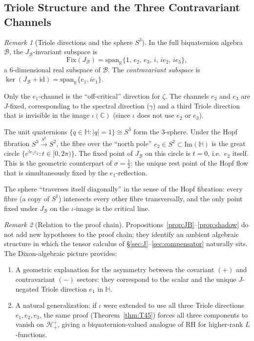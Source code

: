 \documentclass[12pt,a4paper]{article}
\theoremstyle{remark}
\newtheorem*{remark}{Remark}
\begin{document}
\subsection*{Triole Structure and the Three Contravariant Channels}

\begin{remark}[Triole directions and the sphere $S^3$]\label{rem:triole}
In the full biquaternion algebra $\mathcal{B}$, the $J_{\mathcal{B}}$-invariant
subspace is
\[
  \mathrm{Fix}(J_{\mathcal{B}})
  = \mathrm{span}_{\mathbb{R}}\{1,\,e_2,\,e_3,\,i,\,ie_2,\,ie_3\},
\]
a $6$-dimensional real subspace of $\mathcal{B}$.
The \emph{contravariant subspace} is $\ker(J_{\mathcal{B}}+\mathrm{id})
= \mathrm{span}_{\mathbb{R}}\{e_1, ie_1\}$.

Only the $e_1$-channel is the ``off-critical'' direction for $\zeta$.
The channels $e_2$ and $e_3$ are $J$-fixed, corresponding to the spectral
direction ($\gamma$) and a third Triole direction that is invisible in the
image $\iota(\mathbb{C})$ (since $\iota$ does not use $e_2$ or $e_3$).

The unit quaternions $\{q\in\mathbb{H}:|q|=1\}\cong S^3$ form the
3-sphere. Under the Hopf fibration
$S^3\xrightarrow{S^1} S^2$, the fibre over the ``north pole''
$e_2\in S^2\subset\mathrm{Im}(\mathbb{H})$ is the great circle
$\{e^{te_1e_2}:t\in[0,2\pi)\}$.
The fixed point of $J_{\mathcal{B}}$ on this circle is $t=0$,
i.e.\ $e_2$ itself.
This is the geometric counterpart of $\sigma=\tfrac{1}{2}$:
the unique rest point of the Hopf flow that is simultaneously fixed by
the $e_1$-reflection.

The sphere ``traverses itself diagonally'' in the sense of the Hopf
fibration: every fibre (a copy of $S^1$) intersects every other fibre
transversally, and the only point fixed under $J_{\mathcal{B}}$ on the
$\iota$-image is the critical line.
\end{remark}

\begin{remark}[Relation to the proof chain]
Propositions~\ref{prop:JB}--\ref{prop:shadow} do not add new hypotheses
to the proof chain; they identify an ambient algebraic structure in which
the tensor calculus of \S\ref{sec:J}--\ref{sec:compensator} naturally sits.
The Dixon-algebraic picture provides:
\begin{enumerate}[label=(\roman*),leftmargin=*]
\item A geometric explanation for the asymmetry between the covariant $(+)$
  and contravariant $(-)$ sectors: they correspond to the scalar and the
  unique $J$-negated Triole direction $e_1$ in $\mathbb{H}$.
\item A natural generalization: if $\iota$ were extended to use all three
  Triole directions $e_1,e_2,e_3$, the same proof (Theorem~\ref{thm:T45})
  forces all three components to vanish on $\mathcal{H}^+_+$, giving a
  biquaternion-valued analogue of RH for higher-rank $L$-functions.
\end{enumerate}
\end{remark}
\end{document}

